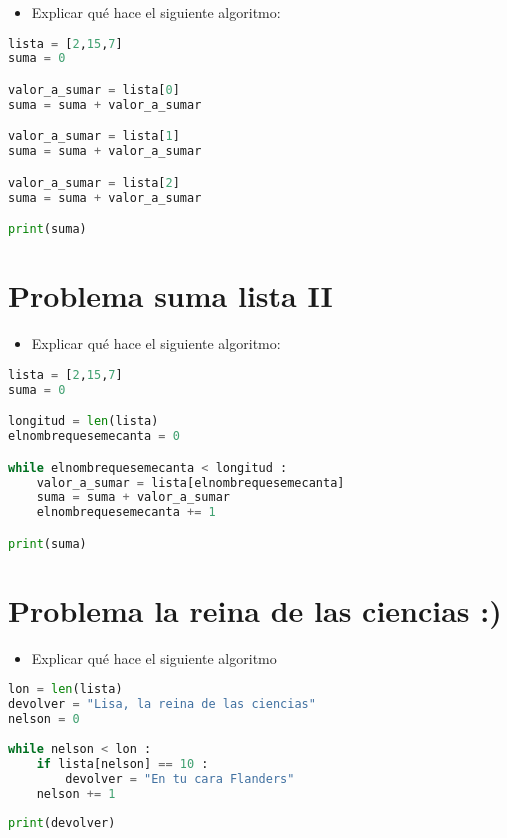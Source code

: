 \documentclass{article}
\begin{document}
\begin{itemize}
    \item Explicar qué  hace el siguiente algoritmo:
\end{itemize}

\begin{lstlisting}[language=Python]
lista = [2,15,7]
suma = 0

valor_a_sumar = lista[0]
suma = suma + valor_a_sumar

valor_a_sumar = lista[1]
suma = suma + valor_a_sumar

valor_a_sumar = lista[2]
suma = suma + valor_a_sumar

print(suma)

\end{lstlisting}


\section{Problema suma lista II}

\begin{itemize}
    \item Explicar qué  hace el siguiente algoritmo:
\end{itemize}

\begin{lstlisting}[language=Python]
lista = [2,15,7]
suma = 0

longitud = len(lista)
elnombrequesemecanta = 0

while elnombrequesemecanta < longitud :
    valor_a_sumar = lista[elnombrequesemecanta]
    suma = suma + valor_a_sumar
    elnombrequesemecanta += 1 

print(suma)
\end{lstlisting}


\section{Problema la reina de las ciencias :)}

\begin{itemize}
    \item Explicar qué hace el siguiente algoritmo
    
\end{itemize}
    
\begin{lstlisting}[language=Python]
lon = len(lista)
devolver = "Lisa, la reina de las ciencias"
nelson = 0
    
while nelson < lon :
	if lista[nelson] == 10 :
		devolver = "En tu cara Flanders"
	nelson += 1
        
print(devolver)

\end{lstlisting}
\end{document}
